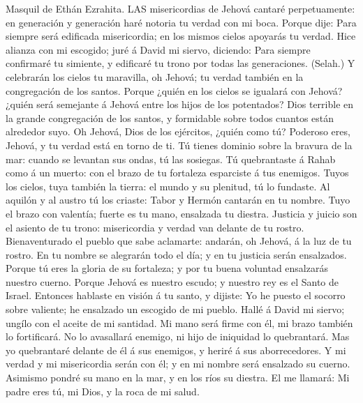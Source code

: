  Masquil de Ethán Ezrahita. LAS misericordias de Jehová
cantaré perpetuamente: en generación y generación haré notoria tu verdad
con mi boca.  Porque dije: Para siempre será edificada
misericordia; en los mismos cielos apoyarás tu verdad.  Hice
alianza con mi escogido; juré á David mi siervo, diciendo: 
Para siempre confirmaré tu simiente, y edificaré tu trono por todas las
generaciones. (Selah.)  Y celebrarán los cielos tu
maravilla, oh Jehová; tu verdad también en la congregación de los
santos.  Porque ¿quién en los cielos se igualará con Jehová?
¿quién será semejante á Jehová entre los hijos de los potentados?
 Dios terrible en la grande congregación de los santos, y
formidable sobre todos cuantos están alrededor suyo.  Oh
Jehová, Dios de los ejércitos, ¿quién como tú? Poderoso eres, Jehová, y
tu verdad está en torno de ti.  Tú tienes dominio sobre la
bravura de la mar: cuando se levantan sus ondas, tú las sosiegas.
 Tú quebrantaste á Rahab como á un muerto: con el brazo de
tu fortaleza esparciste á tus enemigos.  Tuyos los cielos,
tuya también la tierra: el mundo y su plenitud, tú lo fundaste.
 Al aquilón y al austro tú los criaste: Tabor y Hermón
cantarán en tu nombre.  Tuyo el brazo con valentía; fuerte
es tu mano, ensalzada tu diestra.  Justicia y juicio son el
asiento de tu trono: misericordia y verdad van delante de tu rostro.
 Bienaventurado el pueblo que sabe aclamarte: andarán, oh
Jehová, á la luz de tu rostro.  En tu nombre se alegrarán
todo el día; y en tu justicia serán ensalzados.  Porque tú
eres la gloria de su fortaleza; y por tu buena voluntad ensalzarás
nuestro cuerno.  Porque Jehová es nuestro escudo; y nuestro
rey es el Santo de Israel.  Entonces hablaste en visión á
tu santo, y dijiste: Yo he puesto el socorro sobre valiente; he
ensalzado un escogido de mi pueblo.  Hallé á David mi
siervo; ungílo con el aceite de mi santidad.  Mi mano será
firme con él, mi brazo también lo fortificará.  No lo
avasallará enemigo, ni hijo de iniquidad lo quebrantará. 
Mas yo quebrantaré delante de él á sus enemigos, y heriré á sus
aborrecedores.  Y mi verdad y mi misericordia serán con él;
y en mi nombre será ensalzado su cuerno.  Asimismo pondré
su mano en la mar, y en los ríos su diestra.  El me
llamará: Mi padre eres tú, mi Dios, y la roca de mi salud. 
